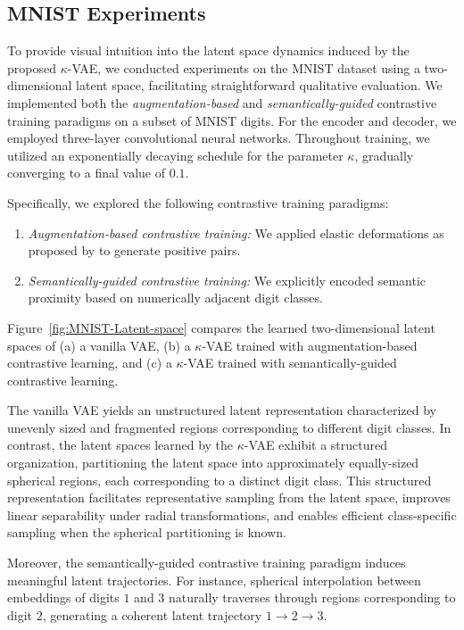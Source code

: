 \subsection{MNIST Experiments}
To provide visual intuition into the latent space dynamics induced by the proposed $\kappa$-VAE, we conducted experiments on the MNIST dataset using a two-dimensional latent space, facilitating straightforward qualitative evaluation. We implemented both the \textit{augmentation-based} and \textit{semantically-guided} contrastive training paradigms on a subset of MNIST digits. For the encoder and decoder, we employed three-layer convolutional neural networks. Throughout training, we utilized an exponentially decaying schedule for the parameter $\kappa$, gradually converging to a final value of $0.1$.

Specifically, we explored the following contrastive training paradigms:
\begin{enumerate}
    \item \textit{Augmentation-based contrastive training:} We applied elastic deformations as proposed by \citet{ronneberger2015u} to generate positive pairs.
    \item \textit{Semantically-guided contrastive training:} We explicitly encoded semantic proximity based on numerically adjacent digit classes.
\end{enumerate}

Figure~\ref{fig:MNIST-Latent-space} compares the learned two-dimensional latent spaces of (a) a vanilla VAE, (b) a $\kappa$-VAE trained with augmentation-based contrastive learning, and (c) a $\kappa$-VAE trained with semantically-guided contrastive learning.

The vanilla VAE yields an unstructured latent representation characterized by unevenly sized and fragmented regions corresponding to different digit classes. In contrast, the latent spaces learned by the $\kappa$-VAE exhibit a structured organization, partitioning the latent space into approximately equally-sized spherical regions, each corresponding to a distinct digit class. This structured representation facilitates representative sampling from the latent space, improves linear separability under radial transformations, and enables efficient class-specific sampling when the spherical partitioning is known.

Moreover, the semantically-guided contrastive training paradigm induces meaningful latent trajectories. For instance, spherical interpolation between embeddings of digits $1$ and $3$ naturally traverses through regions corresponding to digit $2$, generating a coherent latent trajectory $1 \rightarrow 2 \rightarrow 3$.


